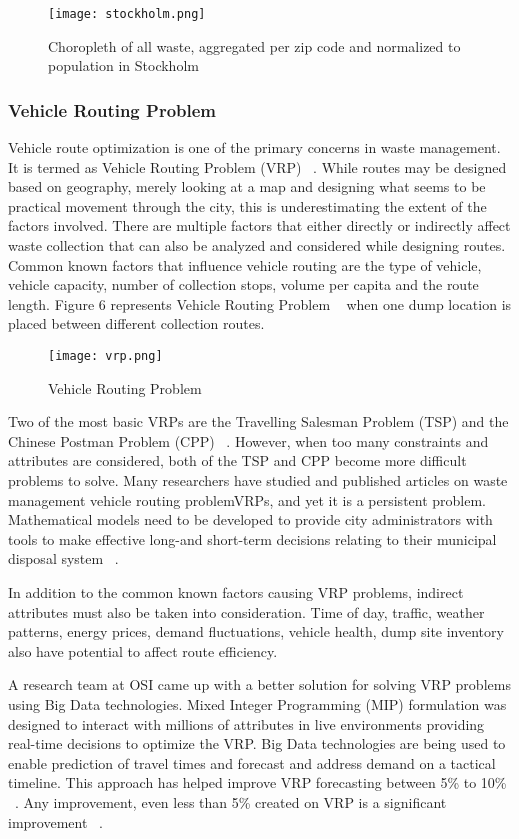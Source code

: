 \documentclass[sigconf]{acmart}
\begin{document}
\begin{figure}[ht!]
  \texttt{[image: stockholm.png]}
  \caption{Choropleth of all waste, aggregated per zip code and normalized to population in Stockholm}
\end{figure}

\subsubsection{Vehicle Routing Problem}
Vehicle route optimization is one of the primary concerns in waste management. It is termed as Vehicle Routing Problem (VRP) ~\cite{dantzig1959}.   While routes may be designed based on geography, merely looking at a map and designing what seems to be practical movement through the city, this is underestimating the extent of the factors involved.  There are multiple factors that either directly or indirectly affect waste collection that can also be analyzed and considered while designing routes. Common known factors that influence vehicle routing are the type of vehicle, vehicle capacity, number of collection stops, volume per capita and the route length. Figure 6 represents Vehicle Routing Problem ~\cite{wikivrp2017} when one dump location is placed between different collection routes.

\begin{figure}[ht!]
  \texttt{[image: vrp.png]}
  \caption{Vehicle Routing Problem}
\end{figure}

Two of the most basic VRPs are the Travelling Salesman Problem (TSP) and the Chinese Postman Problem (CPP) ~\cite{belien2012}. However, when too many constraints and attributes are considered, both of the TSP and CPP become more difficult problems to solve. Many researchers have studied and published articles on waste management vehicle routing problemVRPs, and yet it is a persistent problem. Mathematical models need to be developed to provide city administrators with tools to make effective long-and short-term decisions relating to their municipal disposal system ~\cite{bhat1996}. 

In addition to the common known factors causing VRP problems, indirect attributes must also be taken into consideration.  Time of day, traffic, weather patterns, energy prices, demand fluctuations, vehicle health, dump site inventory also have potential to affect route efficiency. 

A research team at OSI came up with a better solution for solving VRP problems using Big Data technologies. Mixed Integer Programming (MIP) formulation was designed to interact with millions of attributes in live environments providing real-time decisions to optimize the VRP. Big Data technologies are being used to enable prediction of travel times and forecast and address demand on a tactical timeline. This approach has helped improve VRP forecasting between  5\% to 10\% ~\cite{vijay2013}. Any improvement, even less than 5\% created on VRP is a significant improvement ~\cite{hasle2007}.
\end{document}
